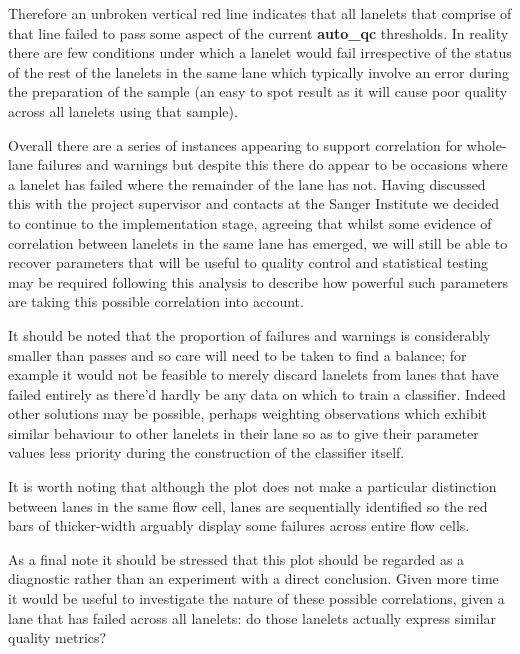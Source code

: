 Therefore an unbroken vertical red line indicates that all lanelets that
comprise of that line failed to pass some aspect of the current
\textbf{auto\_qc} thresholds. In reality there are few conditions under which
a lanelet would fail irrespective of the status of the rest of the lanelets in
the same lane which typically involve an error during the preparation of the
sample (an easy to spot result as it will cause poor quality across all lanelets
using that sample).

Overall there are a series of instances appearing to support correlation for
whole-lane failures and warnings but despite this there do appear to be occasions
where a lanelet has failed where the remainder of the lane has not.
Having discussed this with the project supervisor and contacts at the Sanger Institute we decided to continue to
the implementation stage, agreeing that whilst some evidence of correlation
between lanelets in the same lane has emerged, we will still be able to recover
parameters that will be useful to quality control and statistical testing may be
required following this analysis to describe how powerful such parameters are
taking this possible correlation into account.

It should be
noted that the proportion of failures and warnings is considerably smaller than
passes and so care will need to be taken to find a balance; for example it would
not be feasible to merely discard lanelets from lanes that have failed entirely
as there'd hardly be any data on which to train a classifier. Indeed other
solutions may be possible, perhaps weighting observations which exhibit similar
behaviour to other lanelets in their lane so as to give their parameter values
less priority during the construction of the classifier itself.

It is worth noting that although the plot does not make a particular
distinction between lanes in the same flow cell, lanes are sequentially
identified so the red bars of thicker-width arguably display some failures
across entire flow cells.

As a final note it should be stressed that this plot should be regarded as a
diagnostic rather than an experiment with a direct conclusion. Given more time it
would be useful to investigate the nature of these possible correlations, given
a lane that has failed across all lanelets: do those lanelets actually express
similar quality metrics?

